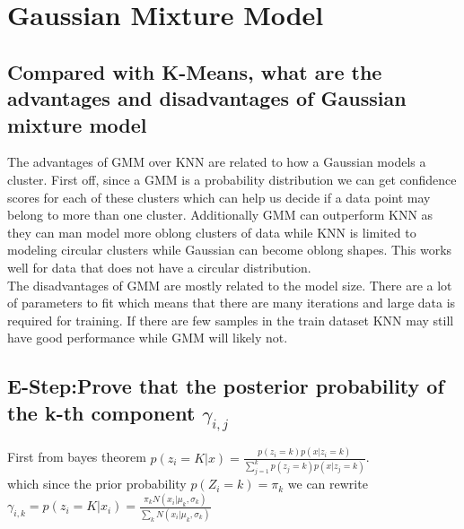 \documentclass[11pt]{article}
\begin{document}
\section{Gaussian Mixture Model}
\subsection{Compared with K-Means, what are the advantages and disadvantages of Gaussian mixture model}
The advantages of GMM over KNN are related to how a Gaussian models a cluster. First off, since a GMM is a probability distribution we can get confidence scores for each of these clusters which can help us decide if a data point may belong to more than one cluster. Additionally GMM can outperform KNN as they can man model more oblong clusters of data while KNN is limited to modeling circular clusters while Gaussian can become oblong shapes. This works well for data that does not have a circular distribution.  \\

The disadvantages of GMM are mostly related to the model size. There are a lot of parameters to fit which means that there are many iterations and large data is required for training. If there are few samples in the train dataset KNN may still have good performance while GMM will likely not.
\subsection{E-Step:Prove that the posterior probability of the k-th component $\gamma_{i,j}$}
First from bayes theorem $p(z_i = K| x) = \frac{p(z_i = k)p(x|z_i = k)}{\sum_{j=1}^k p(z_j = k)p(x| z_j = k)}$. \\
which since the prior probability $p(Z_i=k) = \pi_k$ we can rewrite $\gamma_{i,k} = p(z_i = K| x_i) = \frac{\pi_k  N(x_i | \mu_k , \sigma_k)}{\sum_k N(x_i| \mu_k, \sigma_k)}$ 
\end{document}
